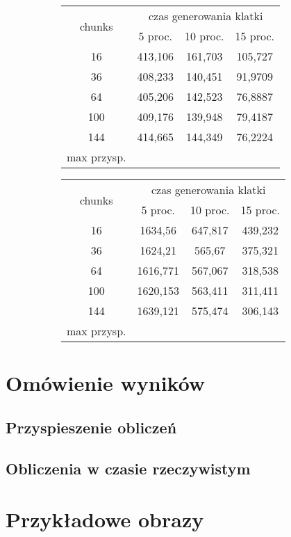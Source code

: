 \begin{figure}[!ht]
\advance\leftskip-2cm
	\begin{subfigure}{.5\textwidth}
\begin{tabular}{|c|c|c|c|} \hline
	    \multirow{2}{*}{chunks} & \multicolumn{3}{|c|}{czas generowania klatki} \\ \cline{2-4}
	 	& 5 proc. & 10 proc. & 15 proc. \\ \hline
	    16 & 413,106 & 161,703 & 105,727 \\ 
	    36 & 408,233 & 140,451 & 91,9709 \\
		64 & 405,206 & 142,523 & 76,8887 \\
		100 & 409,176 & 139,948 & 79,4187 \\
		144 & 414,665 & 144,349 & 76,2224 \\ \hline
		max przysp. & & & \\
		\hline
\end{tabular}
	\end{subfigure}
	\hspace{2cm}
	\begin{subfigure}{.5\textwidth}
\begin{tabular}{|c|c|c|c|} \hline
	    \multirow{2}{*}{chunks} & \multicolumn{3}{|c|}{czas generowania klatki} \\ \cline{2-4}
	 	& 5 proc. & 10 proc. & 15 proc. \\ \hline
	    16 & 1634,56 & 647,817 & 439,232 \\ 
	    36 & 1624,21 & 565,67 & 375,321 \\
		64 & 1616,771 & 567,067 & 318,538 \\
		100 & 1620,153 & 563,411 & 311,411 \\
		144 & 1639,121 & 575,474 & 306,143 \\ \hline
		max przysp. & & & \\
		\hline
\end{tabular}
	\end{subfigure}
\end{figure}

\section{Omówienie wyników}
	\subsection{Przyspieszenie obliczeń}
	\subsection{Obliczenia w czasie rzeczywistym}
\section{Przykładowe obrazy}